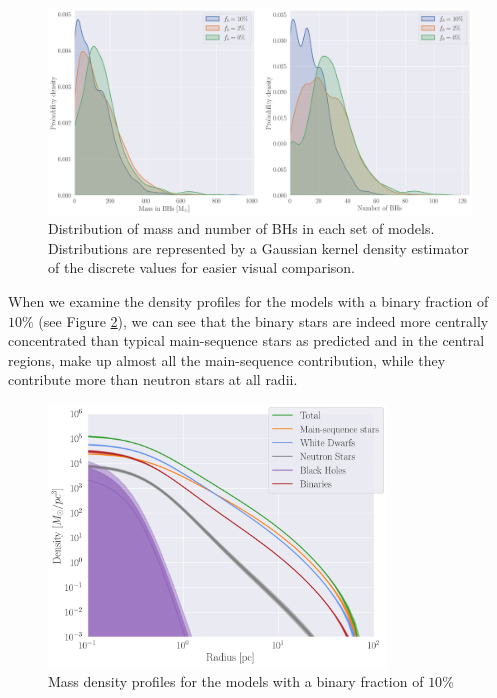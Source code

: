 \begin{figure}
	\centering
	\includegraphics[width=\textwidth]{figures/BH_KDEs.png}
	\caption{Distribution of mass and number of BHs in each set of models. Distributions are
represented by a Gaussian kernel density estimator of the discrete values for easier visual
		comparison.}
	\label{fig:BH_KDEs}
\end{figure}

When we examine the density profiles for the models with a binary fraction of $10\%$ (see Figure
\ref{fig:highbin_model_densities}), we can see that the binary stars are indeed more centrally
concentrated than typical main-sequence stars as predicted and in the central regions, make up
almost all the main-sequence contribution, while they contribute more than neutron stars at all
radii.



\begin{figure}
	\centering
	\includegraphics[width=0.8\textwidth]{figures/high_bin_model/density.png}
	\caption{Mass density profiles for the models with a binary fraction of $10\%$}
	\label{fig:highbin_model_densities}
\end{figure}

